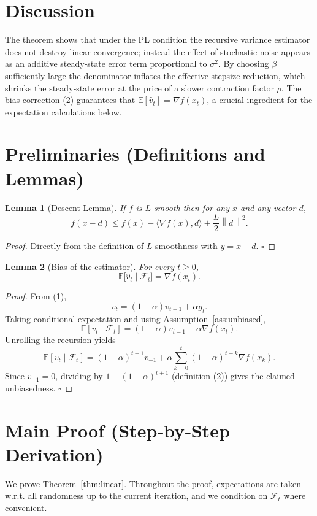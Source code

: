 \documentclass{article}
\newtheorem{lemma}{Lemma}
\newcommand{\E}{\mathbb{E}}
\newcommand{\norm}[1]{\left\lVert #1\right\rVert}
\begin{document}
\section*{Discussion}
The theorem shows that under the PL condition the recursive variance estimator does not destroy linear convergence; instead the effect of stochastic noise appears as an additive steady‑state error term proportional to $\sigma^2$. By choosing $\beta$ sufficiently large the denominator inflates the effective stepsize reduction, which shrinks the steady‑state error at the price of a slower contraction factor $\rho$. The bias correction (2) guarantees that $\E[\hat v_t]=\nabla f(x_t)$, a crucial ingredient for the expectation calculations below.

\section*{Preliminaries (Definitions and Lemmas)}
\begin{lemma}[Descent Lemma]\label{lem:descent}
If $f$ is $L$‑smooth then for any $x$ and any vector $d$,
\[
f(x-d)\le f(x)-\langle\nabla f(x),d\rangle+\frac{L}{2}\norm{d}^2 .
\]
\end{lemma}
\begin{proof}
Directly from the definition of $L$‑smoothness with $y=x-d$. \hfill $\square$
\end{proof}

\begin{lemma}[Bias of the estimator]\label{lem:bias}
For every $t\ge0$,
\[
\E\!\bigl[\hat v_t\mid\mathcal{F}_t\bigr]=\nabla f(x_t).
\]
\end{lemma}
\begin{proof}
From (1),
\[
v_t=(1-\alpha)v_{t-1}+\alpha g_t .
\]
Taking conditional expectation and using Assumption~\ref{ass:unbiased},
\[
\E[v_t\mid\mathcal{F}_t]=(1-\alpha)v_{t-1}+\alpha\nabla f(x_t).
\]
Unrolling the recursion yields
\[
\E[v_t\mid\mathcal{F}_t]=(1-\alpha)^{t+1}v_{-1}+\alpha\sum_{k=0}^{t}(1-\alpha)^{t-k}\nabla f(x_k).
\]
Since $v_{-1}=0$, dividing by $1-(1-\alpha)^{t+1}$ (definition (2)) gives the claimed unbiasedness. \hfill $\square$
\end{proof}

\section*{Main Proof (Step‑by‑Step Derivation)}
We prove Theorem~\ref{thm:linear}. Throughout the proof, expectations are taken w.r.t. all randomness up to the current iteration, and we condition on $\mathcal{F}_t$ where convenient.
\end{document}
